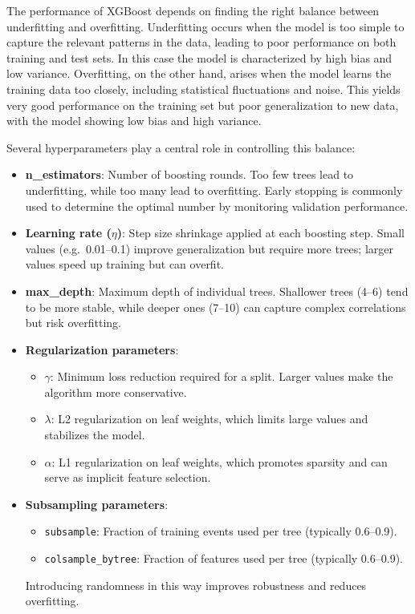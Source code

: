 The performance of XGBoost depends on finding the right balance between underfitting and overfitting. Underfitting occurs when the model is too simple to capture the relevant patterns in the data, leading to poor performance on both training and test sets. In this case the model is characterized by high bias and low variance. Overfitting, on the other hand, arises when the model learns the training data too closely, including statistical fluctuations and noise. This yields very good performance on the training set but poor generalization to new data, with the model showing low bias and high variance.

Several hyperparameters play a central role in controlling this balance:

\begin{itemize}
    \item \textbf{n\_estimators}: Number of boosting rounds. Too few trees lead to underfitting, while too many lead to overfitting. Early stopping is commonly used to determine the optimal number by monitoring validation performance.
    
    \item \textbf{Learning rate ($\eta$)}: Step size shrinkage applied at each boosting step. Small values (e.g.\ 0.01–0.1) improve generalization but require more trees; larger values speed up training but can overfit.
    
    \item \textbf{max\_depth}: Maximum depth of individual trees. Shallower trees (4–6) tend to be more stable, while deeper ones (7–10) can capture complex correlations but risk overfitting.
    
    \item \textbf{Regularization parameters}:
    \begin{itemize}
        \item $\gamma$: Minimum loss reduction required for a split. Larger values make the algorithm more conservative.
        \item $\lambda$: L2 regularization on leaf weights, which limits large values and stabilizes the model.
        \item $\alpha$: L1 regularization on leaf weights, which promotes sparsity and can serve as implicit feature selection.
    \end{itemize}
    
    \item \textbf{Subsampling parameters}:
    \begin{itemize}
        \item \texttt{subsample}: Fraction of training events used per tree (typically 0.6–0.9).
        \item \texttt{colsample\_bytree}: Fraction of features used per tree (typically 0.6–0.9).
    \end{itemize}
    Introducing randomness in this way improves robustness and reduces overfitting.
\end{itemize}


